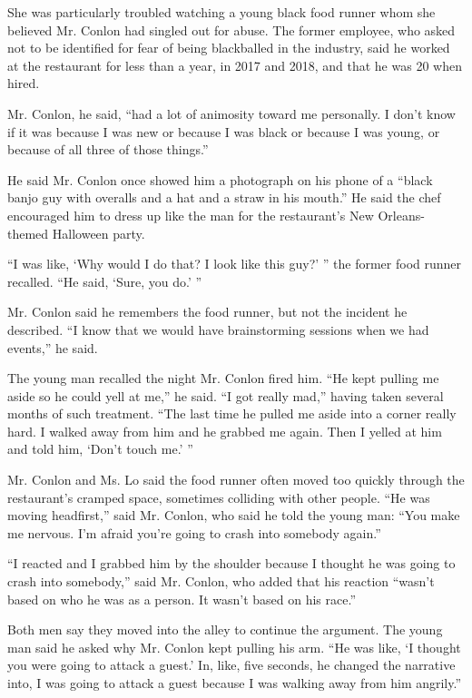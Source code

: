 She was particularly troubled watching a young black food runner whom
she believed Mr. Conlon had singled out for abuse. The former employee,
who asked not to be identified for fear of being blackballed in the
industry, said he worked at the restaurant for less than a year, in 2017
and 2018, and that he was 20 when hired.

Mr. Conlon, he said, ``had a lot of animosity toward me personally. I
don't know if it was because I was new or because I was black or because
I was young, or because of all three of those things.''

He said Mr. Conlon once showed him a photograph on his phone of a
``black banjo guy with overalls and a hat and a straw in his mouth.'' He
said the chef encouraged him to dress up like the man for the
restaurant's New Orleans-themed Halloween party.

``I was like, `Why would I do that? I look like this guy?' '' the former
food runner recalled. ``He said, `Sure, you do.' ''

Mr. Conlon said he remembers the food runner, but not the incident he
described. ``I know that we would have brainstorming sessions when we
had events,'' he said.

The young man recalled the night Mr. Conlon fired him. ``He kept pulling
me aside so he could yell at me,'' he said. ``I got really mad,'' having
taken several months of such treatment. ``The last time he pulled me
aside into a corner really hard. I walked away from him and he grabbed
me again. Then I yelled at him and told him, `Don't touch me.' ''

Mr. Conlon and Ms. Lo said the food runner often moved too quickly
through the restaurant's cramped space, sometimes colliding with other
people. ``He was moving headfirst,'' said Mr. Conlon, who said he told
the young man: ``You make me nervous. I'm afraid you're going to crash
into somebody again.''

``I reacted and I grabbed him by the shoulder because I thought he was
going to crash into somebody,'' said Mr. Conlon, who added that his
reaction ``wasn't based on who he was as a person. It wasn't based on
his race.''

Both men say they moved into the alley to continue the argument. The
young man said he asked why Mr. Conlon kept pulling his arm. ``He was
like, `I thought you were going to attack a guest.' In, like, five
seconds, he changed the narrative into, I was going to attack a guest
because I was walking away from him angrily.''

